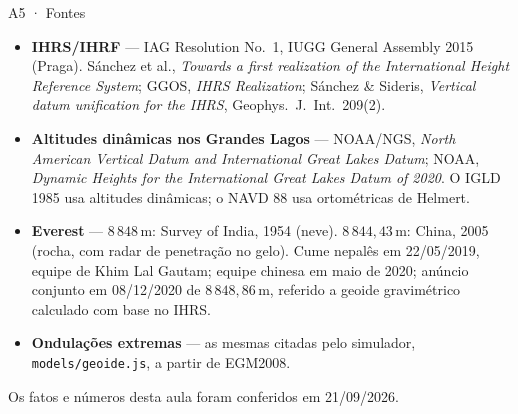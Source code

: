\documentclass[aspectratio=169,11pt]{beamer}
\begin{document}
\begin{frame}{A5 · Fontes}
  \scriptsize
  \begin{itemize}
    \item \textbf{IHRS/IHRF} --- IAG Resolution No.~1, IUGG General Assembly 2015 (Praga).
          Sánchez et al., \emph{Towards a first realization of the International Height
          Reference System}; GGOS, \emph{IHRS Realization}; Sánchez \& Sideris,
          \emph{Vertical datum unification for the IHRS}, Geophys.~J.~Int.~209(2).
    \item \textbf{Altitudes dinâmicas nos Grandes Lagos} --- NOAA/NGS, \emph{North American
          Vertical Datum and International Great Lakes Datum}; NOAA, \emph{Dynamic Heights
          for the International Great Lakes Datum of 2020}. O IGLD 1985 usa altitudes
          dinâmicas; o NAVD 88 usa ortométricas de Helmert.
    \item \textbf{Everest} --- $8\,848$\,m: Survey of India, 1954 (neve).
          $8\,844{,}43$\,m: China, 2005 (rocha, com radar de penetração no gelo).
          Cume nepalês em 22/05/2019, equipe de Khim Lal Gautam; equipe chinesa em maio de
          2020; anúncio conjunto em 08/12/2020 de $8\,848{,}86$\,m, referido a geoide
          gravimétrico calculado com base no IHRS.
    \item \textbf{Ondulações extremas} --- as mesmas citadas pelo simulador,
          \texttt{models/geoide.js}, a partir de EGM2008.
  \end{itemize}
  \medskip
  \normalsize
  \centering
  Os fatos e números desta aula foram conferidos em 21/09/2026.
\end{frame}
\end{document}
